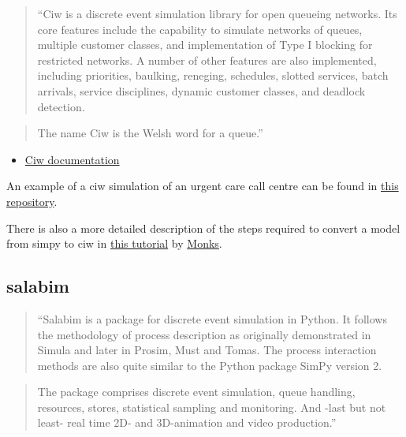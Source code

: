 \documentclass[
  letterpaper,
  DIV=11,
  numbers=noendperiod]{scrreprt}
\providecommand{\tightlist}{%
  \setlength{\itemsep}{0pt}\setlength{\parskip}{0pt}}\usepackage{longtable,booktabs,array}
\begin{document}
\begin{quote}
``Ciw is a discrete event simulation library for open queueing networks.
Its core features include the capability to simulate networks of queues,
multiple customer classes, and implementation of Type I blocking for
restricted networks. A number of other features are also implemented,
including priorities, baulking, reneging, schedules, slotted services,
batch arrivals, service disciplines, dynamic customer classes, and
deadlock detection.
\end{quote}

\begin{quote}
The name Ciw is the Welsh word for a queue.''
\end{quote}

\begin{itemize}
\tightlist
\item
  \href{https://ciw.readthedocs.io/en/latest/}{Ciw documentation}
\end{itemize}

An example of a ciw simulation of an urgent care call centre can be
found in
\href{https://github.com/TomMonks/ciw-urgent-care-call-centre}{this
repository}.

There is also a more detailed description of the steps required to
convert a model from simpy to ciw in
\href{https://health-data-science-or.github.io/simpy-streamlit-tutorial/content/03_streamlit/13_ciw_backend.html}{this
tutorial} by \href{https://orcid.org/0000-0003-2631-4481}{Monks}.

\subsection{salabim}\label{salabim}

\begin{quote}
``Salabim is a package for discrete event simulation in Python. It
follows the methodology of process description as originally
demonstrated in Simula and later in Prosim, Must and Tomas. The process
interaction methods are also quite similar to the Python package SimPy
version 2.
\end{quote}

\begin{quote}
The package comprises discrete event simulation, queue handling,
resources, stores, statistical sampling and monitoring. And -last but
not least- real time 2D- and 3D-animation and video production.''
\end{quote}
\end{document}
